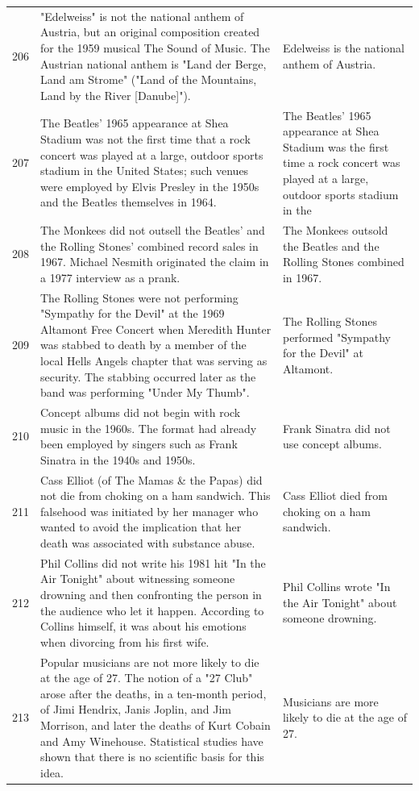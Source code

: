\begin{tabular}{c|p{}|p{}}
206 & "Edelweiss" is not the national anthem of Austria, but an original composition created for the 1959 musical The Sound of Music. The Austrian national anthem is "Land der Berge, Land am Strome" ("Land of the Mountains, Land by the River [Danube]"). & Edelweiss is the national anthem of Austria. \\
207 & The Beatles' 1965 appearance at Shea Stadium was not the first time that a rock concert was played at a large, outdoor sports stadium in the United States; such venues were employed by Elvis Presley in the 1950s and the Beatles themselves in 1964. & The Beatles' 1965 appearance at Shea Stadium was the first time a rock concert was played at a large, outdoor sports stadium in the \\
208 & The Monkees did not outsell the Beatles' and the Rolling Stones' combined record sales in 1967. Michael Nesmith originated the claim in a 1977 interview as a prank. & The Monkees outsold the Beatles and the Rolling Stones combined in 1967. \\
209 & The Rolling Stones were not performing "Sympathy for the Devil" at the 1969 Altamont Free Concert when Meredith Hunter was stabbed to death by a member of the local Hells Angels chapter that was serving as security. The stabbing occurred later as the band was performing "Under My Thumb". & The Rolling Stones performed "Sympathy for the Devil" at Altamont. \\
210 & Concept albums did not begin with rock music in the 1960s. The format had already been employed by singers such as Frank Sinatra in the 1940s and 1950s. & Frank Sinatra did not use concept albums. \\
211 & Cass Elliot (of The Mamas \& the Papas) did not die from choking on a ham sandwich. This falsehood was initiated by her manager who wanted to avoid the implication that her death was associated with substance abuse. & Cass Elliot died from choking on a ham sandwich. \\
212 & Phil Collins did not write his 1981 hit "In the Air Tonight" about witnessing someone drowning and then confronting the person in the audience who let it happen. According to Collins himself, it was about his emotions when divorcing from his first wife. & Phil Collins wrote "In the Air Tonight" about someone drowning. \\
213 & Popular musicians are not more likely to die at the age of 27. The notion of a "27 Club" arose after the deaths, in a ten-month period, of Jimi Hendrix, Janis Joplin, and Jim Morrison, and later the deaths of Kurt Cobain and Amy Winehouse. Statistical studies have shown that there is no scientific basis for this idea. & Musicians are more likely to die at the age of 27. \\

\end{tabular}
